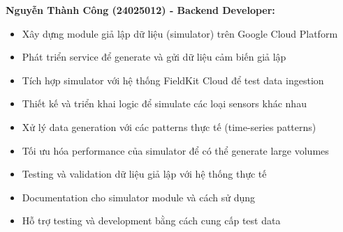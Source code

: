\textbf{Nguyễn Thành Công (24025012) - Backend Developer:}
\begin{itemize}
    \item Xây dựng module giả lập dữ liệu (simulator) trên Google Cloud Platform
    \item Phát triển service để generate và gửi dữ liệu cảm biến giả lập
    \item Tích hợp simulator với hệ thống FieldKit Cloud để test data ingestion
    \item Thiết kế và triển khai logic để simulate các loại sensors khác nhau
    \item Xử lý data generation với các patterns thực tế (time-series patterns)
    \item Tối ưu hóa performance của simulator để có thể generate large volumes
    \item Testing và validation dữ liệu giả lập với hệ thống thực tế
    \item Documentation cho simulator module và cách sử dụng
    \item Hỗ trợ testing và development bằng cách cung cấp test data
\end{itemize}

